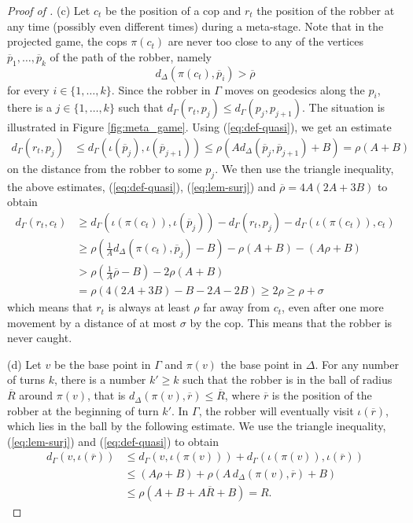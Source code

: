 \documentclass{amsart}
\theoremstyle{definition}
\theoremstyle{remark}
\theoremstyle{remark}
\theoremstyle{definition}
\renewcommand{\leq}{\leqslant}
\renewcommand{\geq}{\geqslant}
\begin{document}
\begin{proof}[Proof of ]
(c) Let $c_t$ be the position of a cop and $r_t$ the position of the robber at any time (possibly even different times) during a meta-stage. Note that in the projected game, the cops $\pi(c_t)$ are never too close to any of the vertices $\overline{p}_1, \ldots , \overline{p}_k$ of the path of the robber, namely
$$
d_\Delta(\pi(c_t), \overline{p}_i) > \overline{\rho}
$$
for every $i \in \{1, \ldots, k\}$. Since the robber in $\Gamma$ moves on geodesics along the $p_i$, there is a $j \in \{1, \ldots, k\}$ such that $d_{\Gamma}(r_t, p_j) \leq d_{\Gamma}(p_j, p_{j+1})$. The situation is illustrated in Figure \ref{fig:meta_game}. Using (\ref{eq:def-quasi}), we get an estimate
\begin{align*}
    d_{\Gamma}(r_t, p_j)
    &\leq d_{\Gamma}(\iota(\overline{p}_j), \iota(\overline{p}_{j+1}))
     \leq \rho ( A d_\Delta(\overline{p}_j, \overline{p}_{j+1}) + B ) = \rho(A + B)
\end{align*}
on the distance from the robber to some $p_j$. We then use the triangle inequality, the above estimates, (\ref{eq:def-quasi}), (\ref{eq:lem-surj}) and $\overline{\rho} = 4A(2A + 3B)$ to obtain
\begin{align*}
    d_{\Gamma}(r_t, c_t) & \geq d_{\Gamma}(\iota (\pi (c_t)) , \iota(\overline{p}_j)) - d_{\Gamma}(r_t , p_j) - d_{\Gamma}(\iota(\pi(c_t)), c_t) \\
    & \geq \rho \left(\frac{1}{A} d_\Delta(\pi(c_t), \overline{p}_j) - B \right) - \rho (A + B) - (A\rho + B) \\
    & > \rho \left( \frac{1}{A} \overline{\rho} - B \right) - 2\rho(A+B) \\
    & = \rho ( 4(2A+3B) -B -2A -2B) \geq 2\rho \geq \rho + \sigma
\end{align*}
which means that $r_t$ is always at least $\rho$ far away from $c_t$, even after one more movement by a distance of at most $\sigma$ by the cop. This means that the robber is never caught.

(d) Let $v$ be the base point in $\Gamma$ and $\pi(v)$ the base point in $\Delta$.
For any number of turns $k$, there is a number $k' \geq k$ such that the robber is in the ball of radius $\overline{R}$ around $\pi(v)$, that is $d_\Delta(\pi(v), \overline{r}) \leq \overline{R}$, where $\overline{r}$ is the position of the robber at the beginning of turn $k'$. In $\Gamma$, the robber will eventually visit $\iota(\overline{r})$, which lies in the ball by the following estimate. We use the triangle inequality, (\ref{eq:lem-surj}) and (\ref{eq:def-quasi}) to obtain
\begin{align*}
    d_{\Gamma}(v,\iota(\overline{r})) & \leq d_{\Gamma}(v, \iota(\pi(v))) + d_{\Gamma}( \iota(\pi(v)), \iota(\overline{r}))  \\
    &\leq ( A\rho + B) + \rho(A \, d_\Delta(\pi(v),\overline{r}) + B) \\
    &
    \leq  \rho (A + B + A\overline{R} + B)= R.
\end{align*}



\end{proof}
\end{document}
